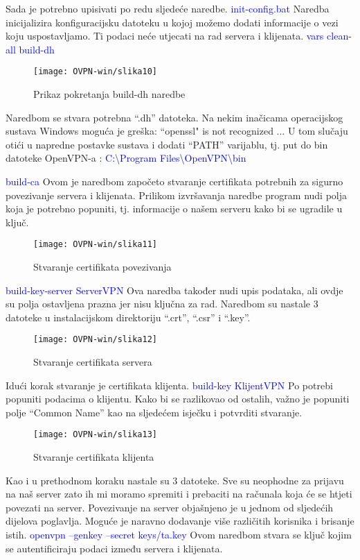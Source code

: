 Sada je potrebno upisivati po redu sljedeće naredbe.
\smallbreak
\textcolor{blue}{init-config.bat}
\smallbreak
Naredba inicijalizira konfiguracijsku datoteku u kojoj možemo dodati informacije o vezi koju uspostavljamo. Ti podaci neće utjecati na rad servera i klijenata.
\smallbreak
\textcolor{blue}{vars}
\smallbreak
\smallbreak
\textcolor{blue}{clean-all}
\smallbreak
\smallbreak
\textcolor{blue}{build-dh}
\smallbreak
\begin{figure}[h!]
	\centering
     \texttt{[image: OVPN-win/slika10]}
     \caption{Prikaz pokretanja build-dh naredbe}
\end{figure}
\FloatBarrier
Naredbom se stvara potrebna ``.dh'' datoteka. Na nekim inačicama operacijskog sustava Windows moguća je greška: ``openssl" is not recognized ...\smallbreak
U tom slučaju otići u napredne postavke sustava i dodati ``PATH'' varijablu, tj. put do bin datoteke OpenVPN-a :
\textcolor{blue}{C:\textbackslash Program Files\textbackslash OpenVPN\textbackslash bin}
	
\smallbreak
\textcolor{blue}{build-ca}
\smallbreak
Ovom je naredbom započeto stvaranje certifikata potrebnih za sigurno povezivanje servera i klijenata. Prilikom izvršavanja naredbe program nudi polja koja je potrebno popuniti, tj. informacije o našem serveru kako bi se ugradile u ključ.
\begin{figure}[h!]
	\centering
     \texttt{[image: OVPN-win/slika11]}
     \caption{Stvaranje certifikata povezivanja}
\end{figure}
\FloatBarrier
\smallbreak
\textcolor{blue}{build-key-server ServerVPN}
\smallbreak
Ova naredba također nudi upis podataka, ali ovdje su polja ostavljena prazna jer nisu ključna za rad. Naredbom su nastale 3 datoteke u instalacijskom direktoriju ``.crt'',  ``.csr'' i ``.key''.
\begin{figure}[h!]
	\centering
     \texttt{[image: OVPN-win/slika12]}
     \caption{Stvaranje certifikata servera}
\end{figure}
\FloatBarrier
Idući korak stvaranje je certifikata klijenta.
\smallbreak
\textcolor{blue}{build-key KlijentVPN}
\smallbreak
Po potrebi popuniti podacima o klijentu. Kako bi se razlikovao od ostalih, važno je popuniti polje ``Common Name'' kao na sljedećem isječku i potvrditi stvaranje.
\begin{figure}[h!]
	\centering
     \texttt{[image: OVPN-win/slika13]}
     \caption{Stvaranje certifikata klijenta}
\end{figure}
\FloatBarrier
Kao i u prethodnom koraku nastale su 3 datoteke. Sve su neophodne za prijavu na naš server zato ih mi moramo spremiti i prebaciti na računala koja će se htjeti povezati na server. Povezivanje na server objašnjeno je u jednom od sljedećih dijelova poglavlja.\smallbreak
Moguće je naravno dodavanje više različitih korisnika i brisanje istih.
\smallbreak
\textcolor{blue}{openvpn --genkey --secret keys/ta.key}
\smallbreak
Ovom naredbom stvara se ključ kojim se autentificiraju podaci između servera i klijenata.
 
